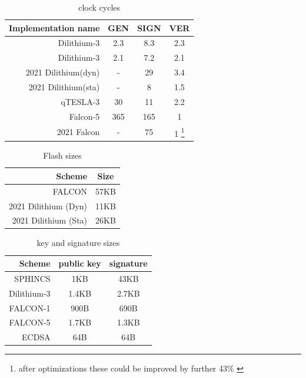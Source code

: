 \documentclass[ucs,10pt]{beamer}
\begin{document}
\begin{frame}[allowframebreaks]
\begin{table}%
    \caption{clock cycles}
    \label{t:clockcycles_comp}
    \centering\begin{tabular}{| r | c c c |}
        \hline
        Implementation name                     & GEN           & SIGN         & VER \\
        \hline
        Dilithium-3 \cite{QR_Iot_Lattice}       & 2.3           & 8.3          & 2.3 \\
        Dilithium-3 \cite{Energy_comp}          & 2.1           & 7.2          & 2.1 \\ %
        2021 Dilithium(dyn)\cite{update_sign}   & -             & 29           & 3.4\\
        2021 Dilithium(sta)\cite{update_sign}   & -             & 8            & 1.5\\
        qTESLA-3 \cite{QR_Iot_Lattice}          & 30            & 11           & 2.2\\
        Falcon-5 \cite{QR_Iot_Lattice}          & 365           & 165          & 1\\
        2021 Falcon  \cite{update_sign}         & -             & 75           & 1 \footnote{after optimizations these could be improved by further 43\% \cite{falcon_micro_impl}}\\
        \hline
    \end{tabular}
    
\end{table}

\begin{table}%
    \caption{Flash sizes}
    \label{t:flashsize_comp}
    \centering\begin{tabular}{| r | c |}
        \hline
        Scheme & Size \\
        \hline
        FALCON & 57KB \\
        2021 Dilithium (Dyn) & 11KB\\
        2021 Dilithium (Sta) & 26KB\\
        \hline
    \end{tabular}
\end{table}

\begin{table}%
    \caption{key and signature sizes}
    \label{t:key_sig_comp}
    \centering\begin{tabular}{ | r | c c | }
        \hline
        Scheme & public key & signature \\
        \hline
        SPHINCS     & 1KB   & 43KB \\
        Dilithium-3 & 1.4KB & 2.7KB\\
        FALCON-1    & 900B  & 690B\\
        FALCON-5    & 1.7KB & 1.3KB\\
        \hline
        ECDSA       & 64B   & 64B\\
        \hline
    \end{tabular}
\end{table}

\end{frame}
\end{document}
